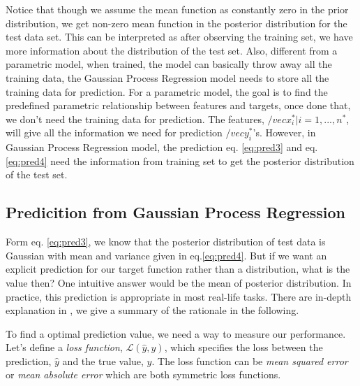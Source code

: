\documentclass[12pt,a4paper]{article}
\theoremstyle{definition}
\numberwithin{equation}{section}
\begin{document}
Notice that though we assume the mean function as constantly zero in the prior distribution, we get non-zero mean function in the posterior distribution for the test data set. This can be interpreted as after observing the training set, we have more information about the distribution of the test set. Also, different from a parametric model, when trained, the model can basically throw away all the training data, the Gaussian Process Regression model needs to store all the training data for prediction. For a parametric model, the goal is to find the predefined parametric relationship between features and targets, once done that, we don't need the training data for prediction. The features, ${/vec x^*_i | i=1,...,n^*}$, will give all the information we need for prediction $/vec y^*_i$'s. However, in Gaussian Process Regression model, the prediction eq. \ref{eq:pred3} and eq. \ref{eq:pred4} need the information from training set to get the posterior distribution of the test set.

\subsection{Predicition from Gaussian Process Regression}\label{sec:decision_theory}
Form eq. \ref{eq:pred3}, we know that the posterior distribution of test data is Gaussian with mean and variance given in eq.\ref{eq:pred4}. But if we want an explicit prediction for our target function rather than a distribution, what is the value then? One intuitive answer would be the mean of posterior distribution. In practice, this prediction is appropriate in most real-life tasks. There are in-depth explanation in \cite[Rasmussen and Williams, sec 2.4]{RandW}, we give a summary of the rationale in the following.

To find a optimal prediction value, we need a way to measure our performance. Let's define a \textit{loss function}, $\mathcal{L}(\hat y,y)$, which specifies the loss between the prediction, $\hat y$ and the true value, $y$. The loss function can be \textit{mean squared error} or \textit{mean absolute error} which are both symmetric loss functions.
\end{document}
